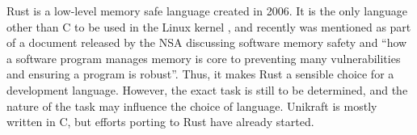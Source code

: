 \documentclass{article}
\begin{document}
\noindent Rust is a low-level memory safe language created in 2006.
It is the only language other than C to be used in the Linux kernel \cite{rust-linux}, and recently was mentioned as part of a document released by the NSA \cite{nsa2022memory} discussing software memory safety and ``how a software program manages memory is core to preventing many vulnerabilities and ensuring a program is robust''.
 Thus, it makes Rust a sensible choice for a development language. However, the exact task is still to be determined, and the nature of the task may influence the choice of language. Unikraft is mostly written in C, but efforts porting to Rust have already started.




\end{document}
